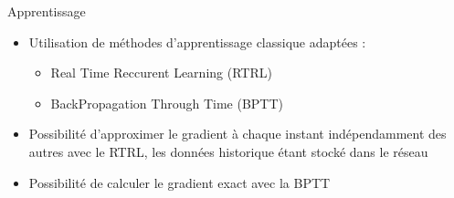 \begin{frame}{Apprentissage}
    \begin{itemize}
        \item Utilisation de méthodes d'apprentissage classique adaptées :
            \begin{itemize}
                \item Real Time Reccurent Learning (RTRL) \cite{Robinson87}
                \item BackPropagation Through Time (BPTT) \cite{Williams95}
            \end{itemize}
        \item Possibilité d'approximer le gradient à chaque instant indépendamment des autres avec le RTRL, les données historique étant stocké dans le réseau
        \item Possibilité de calculer le gradient exact avec la BPTT \cite{Graves05b}
    \end{itemize}
\end{frame}